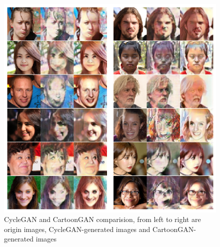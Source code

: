 \documentclass[10pt,twocolumn,letterpaper]{article}
\begin{document}
\begin{figure}
   \centering
   \includegraphics[width=.7\linewidth]{cartoongan-compare}
   \caption{CycleGAN and CartoonGAN comparision, from left to right are origin
   images, CycleGAN-generated images and CartoonGAN-generated images}
   \label{fig:cartoongan-compare}
\end{figure}
\end{document}
